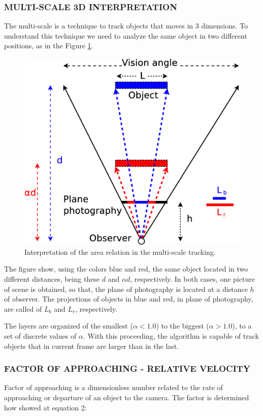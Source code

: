 \subsubsection{MULTI-SCALE 3D INTERPRETATION}
The multi-scale is a technique to track objects that moves in 3 dimensions. 
To understand this technique we need to analyze the same object in 
two different positions, as in the Figure \ref{fig:multiscale3d}.

\begin{figure}[H]
\centering
  \includegraphics[width=.7\columnwidth]{images/Diagrama3.eps}
  \caption{Interpretation of the area relation in the multi-scale tracking.}
  \label{fig:multiscale3d}
\end{figure}
The figure show, using the colors blue and red, the same object located in two 
different distances, being these $d$ and $\alpha d$, respectively. 
In both cases, one picture of scene is obtained,
so that, the plane of photography is located at a distance $h$ of observer.
The projections of objects in blue and red, in plane of photography, are
called of $L_b$ and $L_r$, respectively.


The layers are organized of the smallest ($\alpha <1.0$) to the biggest ($\alpha >1.0$), 
to a set of discrete values of $\alpha$. 
With this proceeding, the algorithm is capable of track objects 
that in current frame are larger than in the last.


\subsubsection{FACTOR OF APPROACHING - RELATIVE VELOCITY}
Factor of approaching is a dimensionless number related to the rate of approaching 
or departure of an object to the camera. The factor
is determined how showed at equation 2:

